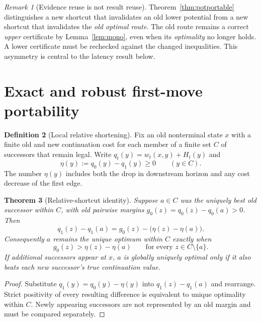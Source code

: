 \documentclass[11pt]{article}
\newtheorem{theorem}{Theorem}[section]
\theoremstyle{definition}\newtheorem{definition}[theorem]{Definition}\newtheorem{assumption}[theorem]{Assumption}
\theoremstyle{remark}\newtheorem{remark}[theorem]{Remark}
\begin{document}
\begin{remark}[Evidence reuse is not result reuse]
Theorem~\ref{thm:potportable} distinguishes a new shortcut that invalidates an old lower potential from a new shortcut that invalidates the \emph{old optimal route}. The old route remains a correct \emph{upper} certificate by Lemma~\ref{lem:mono}, even when its \emph{optimality} no longer holds. A lower certificate must be rechecked against the changed inequalities. This asymmetry is central to the latency result below.
\end{remark}

\section{Exact and robust first-move portability}
\label{sec:first}
\begin{definition}[Local relative shortening]
Fix an old nonterminal state $x$ with a finite old and new continuation cost for each member of a finite set $C$ of successors that remain legal. Write $q_t(y)=w_t(x,y)+H_t(y)$ and
\[
\eta(y):=q_0(y)-q_1(y)\geq0\qquad (y\in C).
\]
The number $\eta(y)$ includes both the drop in downstream horizon and any cost decrease of the first edge.
\end{definition}

\begin{theorem}[Relative-shortcut identity]\label{thm:relative}
Suppose $a\in C$ was the uniquely best old successor within $C$, with old pairwise margins $g_0(z)=q_0(z)-q_0(a)>0$. Then
\[
q_1(z)-q_1(a)=g_0(z)-\bigl(\eta(z)-\eta(a)\bigr).
\]
Consequently $a$ remains the unique optimum within $C$ exactly when
\[
\boxed{g_0(z)>\eta(z)-\eta(a)\qquad\text{for every }z\in C\setminus\{a\}.}
\]
If additional successors appear at $x$, $a$ is globally uniquely optimal only if it also beats each new successor's true continuation value.
\end{theorem}
\begin{proof}
Substitute $q_1(y)=q_0(y)-\eta(y)$ into $q_1(z)-q_1(a)$ and rearrange. Strict positivity of every resulting difference is equivalent to unique optimality within $C$. Newly appearing successors are not represented by an old margin and must be compared separately.
\end{proof}
\par
\end{document}
